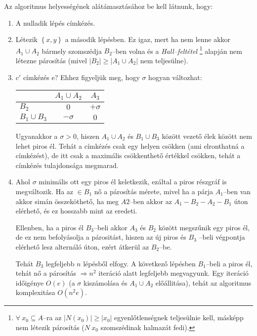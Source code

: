 Az algoritmus helyességének alátámasztásához be kell látnunk, hogy:

\begin{enumerate}
	\item A nulladik lépés címkézés.
	\item Létezik $\left\{x,y\right\}$ a második lépésben. Ez igaz, mert ha nem
	      lenne akkor $A_1 \cup A_2$ bármely szomszédja $B_2$--ben volna és a
	      \emph{Hall--feltétel} \footnote{$ \forall~x_0 \subseteq A$--ra az $|N(x_0)|
			      \geq |x_0|$ egyenlőtlenségnek teljesülnie kell, másképp nem létezik párosítás
		      ($N~x_0$ szomszédinak halmazát fedi).} alapján nem létezne párosítás
	      (mivel $|B_2| \geq |A_1 \cup A_2|$ nem teljesülne).
	\item $c'$ címkézés e? Ehhez figyeljük meg, hogy $\sigma$ hogyan változhat:

	      \begin{tabular}{ l |  c c }
		                     & $A_1 \cup A_2$ & $A_3$     \\
		      \hline
		      $B_2$          & $0$            & $+\sigma$ \\
		      $B_1 \cup B_3$ & $-\sigma$      & $0$       \\
	      \end{tabular}

	      Ugyanakkor a $\sigma > 0 $, hiszen $A_1 \cup A_2$ és $B_1 \cup B_3$ között
	      vezető élek között nem lehet piros él. Tehát a címkézés csak egy helyen
	      csökken (ami elronthatná a címkézést), de itt csak a maximális csökkenthető értékkel
	      csökken, tehát a címkézés tulajdonsága megmarad.

	\item Ahol $\sigma$ minimális ott egy piros él keletkezik, ezáltal a piros
	      részgráf is megváltozik. Ha az $\in B_1$ nő a párosítás mérete, mivel ha a
	      párja $A_1$--ben van akkor simán összeköthető, ha meg $A2$--ben akkor az
	      $A_1-B_2-A_2-B_1$ úton elérhető, és ez hosszabb mint az eredeti.

	      Ellenben, ha a piros él $B_3$--beli akkor $A_3$ és $B_2$ között megszűnik egy
	      piros él, de ez nem befolyásolja a párositást, hiszen az új piros és $B_3$
	      --beli végpontja elérhető lesz alternáló úton, ezért átkerül az $B_2$--be.

	      Tehát $B_3$ legfeljebb $n$ lépésből elfogy. A  következő lépésben $B_1$--beli
	      a piros él, tehát nő a párosítás $\Rightarrow n^2$ iteráció alatt legfeljebb
	      megvagyunk. Egy iteráció időigénye $O(e)$ (a $\sigma$ kiszámolása és $A_1 \cup
		      A_2$ előállitása), tehát az algoritmus komplexitása $O(n^2e)$.
\end{enumerate}
